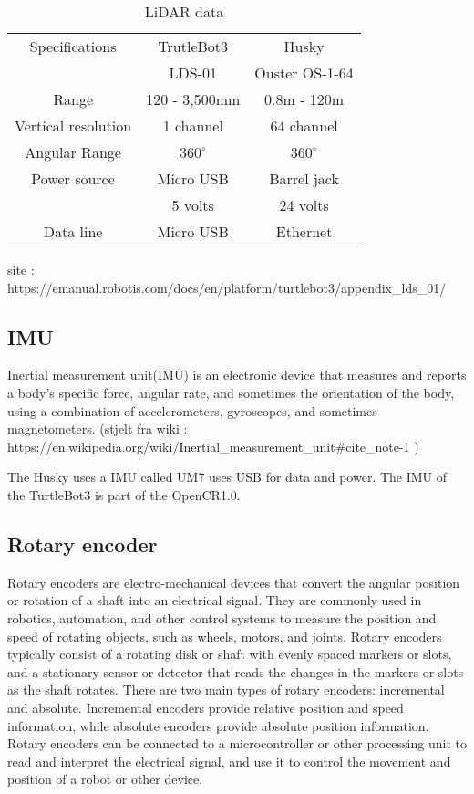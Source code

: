 \begin{table}[h]
    \centering
    \begin{tabular}{c|c|c}
        Specifications          & TrutleBot3        & Husky             \\ 
                                & LDS-01            & Ouster OS-1-64    \\ \hline
        Range                   & 120 - 3,500mm     & 0.8m - 120m       \\ \hline
        Vertical resolution     & 1 channel         & 64 channel        \\ \hline
        Angular Range           & $360^\circ$       & $360^\circ$       \\ \hline  
        Power source            & Micro USB         & Barrel jack       \\  
                                & 5 volts           & 24 volts          \\ \hline
        Data line               & Micro USB         & Ethernet          \\       
    \end{tabular}
    \caption{LiDAR data}
    \label{tab:my_label}
\end{table}

site : 
https://emanual.robotis.com/docs/en/platform/turtlebot3/appendix_lds_01/


\subsection{IMU}
Inertial measurement unit(IMU) is an electronic device that measures and reports a body's specific force, angular rate, and sometimes the orientation of the body, using a combination of accelerometers, gyroscopes, and sometimes magnetometers. 
(stjelt fra wiki : https://en.wikipedia.org/wiki/Inertial_measurement_unit#cite_note-1 ) 

The Husky uses a IMU called UM7 uses USB for data and power. 
The IMU of the TurtleBot3 is part of the OpenCR1.0. 

\subsection{Rotary encoder}
Rotary encoders are electro-mechanical devices that convert the angular position or rotation of a shaft into an electrical signal. They are commonly used in robotics, automation, and other control systems to measure the position and speed of rotating objects, such as wheels, motors, and joints. Rotary encoders typically consist of a rotating disk or shaft with evenly spaced markers or slots, and a stationary sensor or detector that reads the changes in the markers or slots as the shaft rotates. There are two main types of rotary encoders: incremental and absolute. Incremental encoders provide relative position and speed information, while absolute encoders provide absolute position information. Rotary encoders can be connected to a microcontroller or other processing unit to read and interpret the electrical signal, and use it to control the movement and position of a robot or other device.


